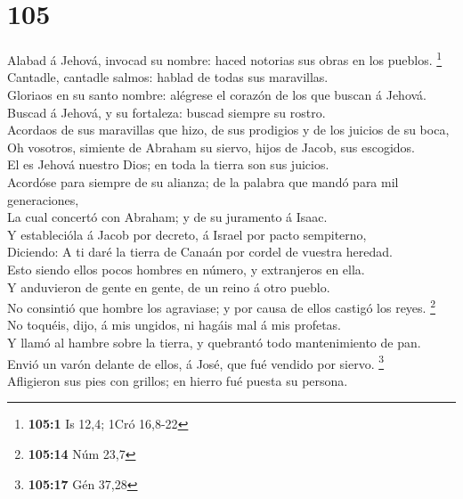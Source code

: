 \hypertarget{section-104}{%
\section{105}\label{section-104}}

 Alabad á Jehová, invocad su nombre: haced notorias sus
obras en los pueblos. \footnote{\textbf{105:1} Is 12,4; 1Cró 16,8-22}\\
 Cantadle, cantadle salmos: hablad de todas sus
maravillas.\\
 Gloriaos en su santo nombre: alégrese el corazón de los que
buscan á Jehová.\\
 Buscad á Jehová, y su fortaleza: buscad siempre su
rostro.\\
 Acordaos de sus maravillas que hizo, de sus prodigios y de
los juicios de su boca,\\
 Oh vosotros, simiente de Abraham su siervo, hijos de Jacob,
sus escogidos.\\
 El es Jehová nuestro Dios; en toda la tierra son sus
juicios.\\
 Acordóse para siempre de su alianza; de la palabra que
mandó para mil generaciones,\\
 La cual concertó con Abraham; y de su juramento á Isaac.\\
 Y establecióla á Jacob por decreto, á Israel por pacto
sempiterno,\\
 Diciendo: A ti daré la tierra de Canaán por cordel de
vuestra heredad.\\
 Esto siendo ellos pocos hombres en número, y extranjeros
en ella.\\
 Y anduvieron de gente en gente, de un reino á otro
pueblo.\\
 No consintió que hombre los agraviase; y por causa de
ellos castigó los reyes. \footnote{\textbf{105:14} Núm 23,7}\\
 No toquéis, dijo, á mis ungidos, ni hagáis mal á mis
profetas.\\
 Y llamó al hambre sobre la tierra, y quebrantó todo
mantenimiento de pan.\\
 Envió un varón delante de ellos, á José, que fué vendido
por siervo. \footnote{\textbf{105:17} Gén 37,28}\\
 Afligieron sus pies con grillos; en hierro fué puesta su
persona.\\
